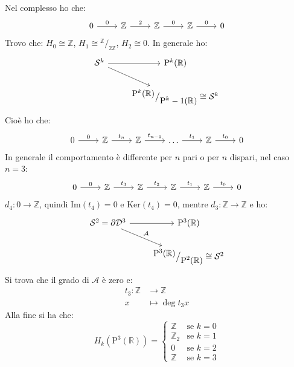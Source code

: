 \documentclass[10pt, twoside=false, x11names]{scrbook}
\newcommand{\Z}{\mathbb{Z}}
\newcommand{\me}{\mathrm{e}}
\newcommand{\im}[1]{\mathrm{Im}( #1 )}
\renewcommand{\ker}[1]{\mathrm{Ker}( #1)}
\newcommand{\Pjr}[1]{\mathrm{P}^#1 (\mathbb{R})}
\newcommand{\Sph}[1][]{\mathcal{S}^#1}
\newcommand{\Disk}[1][]{\mathcal{D}^#1}
\newcommand*\quot[2]{{^{\textstyle #1}\big/_{\textstyle #2}}}
\begin{document}
Nel complesso ho che:
\[
  \begin{tikzcd}
    0 \rar{0} & \Z \rar{2} & \Z \rar{0} & \Z \rar{0} & 0
  \end{tikzcd}
\]
Trovo che: $ H_0 \cong \Z $, $ H_1 \cong \quot{\Z}{2 \Z} $, $ H_2 \cong 0 $.
In generale ho:
\[
  \begin{tikzcd}
    \Sph{k} \rar \arrow{rd}{} & \Pjr{k} \\
    {} & \quot{\Pjr{k}}{\Pjr{k-1}} \cong \Sph{k}
  \end{tikzcd}
\]
Cioè ho che:
\[
  \begin{tikzcd}
    0 \rar{0} & \Z \rar{t_n} & \Z \rar{t_{n-1}} & \dots \rar{t_1 }& \Z \rar{t_0} & 0
  \end{tikzcd}
\]
In generale il comportamento è differente per $ n $ pari o per $ n $
dispari, nel caso $ n = 3 $:
\[
  \begin{tikzcd}
    0 \rar{0} & \Z \rar{t_3} & \Z \rar{t_{2}} & \Z \rar{t_1}& \Z \rar{t_0} & 0
  \end{tikzcd}
\]
$ d_4 \colon 0 \to \Z $, quindi $ \im{t_4} = 0 $ e $ \ker{t_4} = 0 $,
mentre $ d_3 \colon \Z \to \Z $ e ho:
\[
  \begin{tikzcd}
    \Sph{2} = \partial \Disk{3} \rar \arrow{rd}{\mathcal{A}} & \Pjr{3} \\
    {} & \quot{\Pjr{3}}{\Pjr{2}} \cong \Sph{2}
  \end{tikzcd}
\]
Si trova che il grado di $ \mathcal{A} $ è zero e:
\begin{align*}
  t_3 \colon \Z & \to \Z \\
  x & \mapsto \deg{t_3} x
\end{align*}
Alla fine si ha che:
\[
  H_k(\Pjr{3}) =
  \begin{cases}
    \Z & \text{se } k = 0 \\
    \Z_2 & \text{se } k = 1 \\
    0 & \text{se } k = 2 \\
    \Z & \text{se } k = 3
  \end{cases}
\]



\printindex
\end{document}
